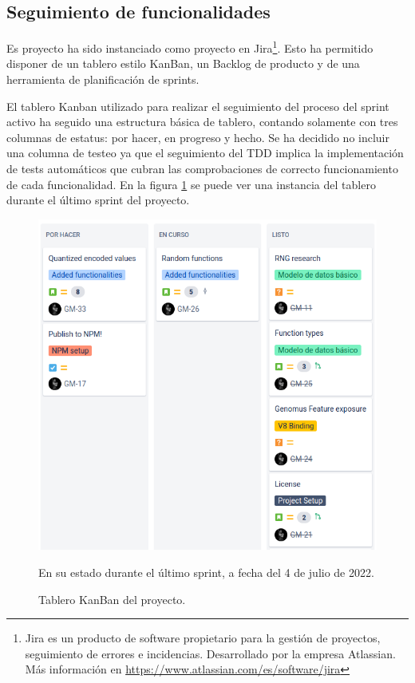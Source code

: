 \subsection{Seguimiento de funcionalidades}
Es proyecto ha sido instanciado como proyecto en Jira\footnote{Jira es un producto de software propietario para la gestión de proyectos, seguimiento de errores e incidencias. Desarrollado por la empresa Atlassian. Más información en \url{https://www.atlassian.com/es/software/jira}}. Esto ha permitido disponer de un tablero estilo KanBan, un Backlog de producto y de una herramienta de planificación de sprints.

El tablero Kanban utilizado para realizar el seguimiento del proceso del sprint activo ha seguido una estructura básica de tablero, contando solamente con tres columnas de estatus: por hacer, en progreso y hecho. Se ha decidido no incluir una columna de testeo ya que el seguimiento del TDD implica la implementación de tests automáticos que cubran las comprobaciones de correcto funcionamiento de cada funcionalidad. En la figura \ref{fig:kanban_board} se puede ver una instancia del tablero durante el último sprint del proyecto.

\begin{figure}
    \centering
    \includegraphics[width=\textwidth]{imagenes/kanban_04_07.png}
    \caption{Tablero KanBan del proyecto.} En su estado durante el último sprint, a fecha del 4 de julio de 2022.
    \label{fig:kanban_board}
\end{figure}

